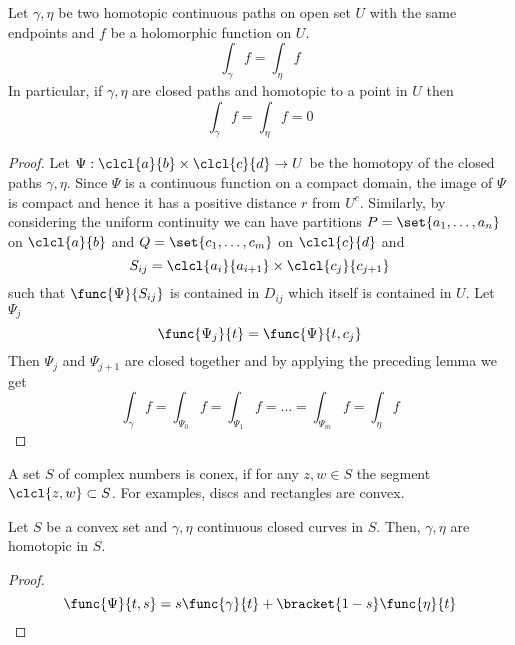 \begin{theorem}
    Let \(\gamma, \eta\) be two homotopic continuous paths on open set \(U\) with the same endpoints and \(f\) be a holomorphic function on \(U\). 
    \begin{equation*}
        \int_{\gamma} f = \int_{\eta} f
    \end{equation*} 
    In particular, if \(\gamma, \eta\) are closed paths and homotopic to a point in \(U\) then 
    \begin{equation*}
        \int_{\gamma} f = \int_{\eta} f = 0
    \end{equation*}
\end{theorem}

\begin{proof}
    Let \(\Psi:\clcl{a}{b} \times \clcl{c}{d} \to U\) be the homotopy of the closed paths \(\gamma,\eta\). Since \(\Psi\) is a continuous function on a compact domain, the image of \(\Psi\) is compact and hence it has a positive distance \(r\) from \(U^c\). Similarly, by considering the uniform continuity we can have partitions \(P = \set{a_1, \dots , a_n}\) on \(\clcl{a}{b}\) and \(Q = \set{c_1, \dots , c_m}\) on \(\clcl{c}{d}\) and
    \begin{equation*}
        S_{ij} = \clcl{a_i }{ a_{i+1}} \times \clcl{c_j }{ c_{j + 1}}
    \end{equation*}
    such that \(\func{\Psi}{S_{ij}}\) is contained in \(D_{ij}\) which itself is contained in \(U\). Let \(\Psi_j\) 
    \begin{equation*}
        \func{\Psi_j}{t} = \func{\Psi}{t,c_j}
    \end{equation*}
    Then \(\Psi_j\) and \(\Psi_{j+1}\) are closed together and by applying the preceding lemma we get 
    \begin{equation*}
        \int_{\gamma} f = \int_{\Psi_0} f = \int_{\Psi_1} f = \dots = \int_{\Psi_m} f = \int_{\eta} f
    \end{equation*}
\end{proof}

A set \(S\) of complex numbers is conex, if for any \(z,w \in S\) the segment \(\clcl{z,w} \subset S\). For examples, discs and rectangles are convex. 
\begin{lemma}
    Let \(S\) be a convex set and \(\gamma, \eta\) continuous closed curves in \(S\). Then, \(\gamma, \eta\) are homotopic in \(S\).
\end{lemma}

\begin{proof}
    \begin{equation*}
        \func{\Psi}{t,s} = s \func{\gamma }{t} + \bracket{1-s} \func{\eta}{t}
    \end{equation*}
\end{proof}

